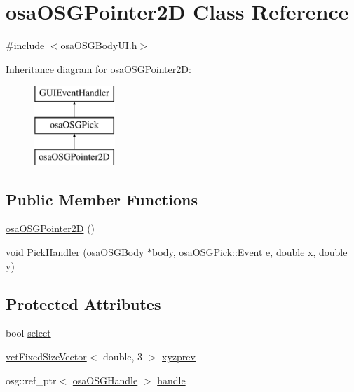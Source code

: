 \hypertarget{classosa_o_s_g_pointer2_d}{\section{osa\-O\-S\-G\-Pointer2\-D Class Reference}
\label{classosa_o_s_g_pointer2_d}
}


{\ttfamily \#include $<$osa\-O\-S\-G\-Body\-U\-I.\-h$>$}

Inheritance diagram for osa\-O\-S\-G\-Pointer2\-D\-:\begin{figure}[H]
\begin{center}
\leavevmode
\includegraphics[height=3.000000cm]{d0/db1/classosa_o_s_g_pointer2_d}
\end{center}
\end{figure}
\subsection*{Public Member Functions}
\begin{DoxyCompactItemize}
\item 
\hyperlink{classosa_o_s_g_pointer2_d_aa7d689b5d456cc113d5b48b903eae739}{osa\-O\-S\-G\-Pointer2\-D} ()
\item 
void \hyperlink{classosa_o_s_g_pointer2_d_a23023fdd12565643645cc74436f19150}{Pick\-Handler} (\hyperlink{classosa_o_s_g_body}{osa\-O\-S\-G\-Body} $\ast$body, \hyperlink{classosa_o_s_g_pick_af50ae1a966b6f3282b707d73f87081d8}{osa\-O\-S\-G\-Pick\-::\-Event} e, double x, double y)
\end{DoxyCompactItemize}
\subsection*{Protected Attributes}
\begin{DoxyCompactItemize}
\item 
bool \hyperlink{classosa_o_s_g_pointer2_d_a4f98fd27df2ef100b7bd58673b2578de}{select}
\item 
\hyperlink{classvct_fixed_size_vector}{vct\-Fixed\-Size\-Vector}$<$ double, 3 $>$ \hyperlink{classosa_o_s_g_pointer2_d_a182ee22feed750daa7d6ee2850e39631}{xyzprev}
\item 
osg\-::ref\-\_\-ptr$<$ \hyperlink{classosa_o_s_g_handle}{osa\-O\-S\-G\-Handle} $>$ \hyperlink{classosa_o_s_g_pointer2_d_a84c0eeeb907fe3c630ef982cbe51d34a}{handle}
\end{DoxyCompactItemize}
